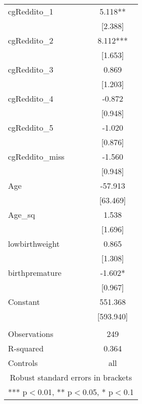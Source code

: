 \documentclass[]{article}
\begin{document}
\begin{tabular}{lc}
cgReddito\_1 & 5.118** \\
 & [2.388] \\
cgReddito\_2 & 8.112*** \\
 & [1.653] \\
cgReddito\_3 & 0.869 \\
 & [1.203] \\
cgReddito\_4 & -0.872 \\
 & [0.948] \\
cgReddito\_5 & -1.020 \\
 & [0.876] \\
cgReddito\_miss & -1.560 \\
 & [0.948] \\
Age & -57.913 \\
 & [63.469] \\
Age\_sq & 1.538 \\
 & [1.696] \\
lowbirthweight & 0.865 \\
 & [1.308] \\
birthpremature & -1.602* \\
 & [0.967] \\
Constant & 551.368 \\
 & [593.940] \\
 &  \\
Observations & 249 \\
R-squared & 0.364 \\
 Controls & all \\ \hline
\multicolumn{2}{c}{ Robust standard errors in brackets} \\
\multicolumn{2}{c}{ *** p$<$0.01, ** p$<$0.05, * p$<$0.1} \\
\end{tabular}
\end{document}
